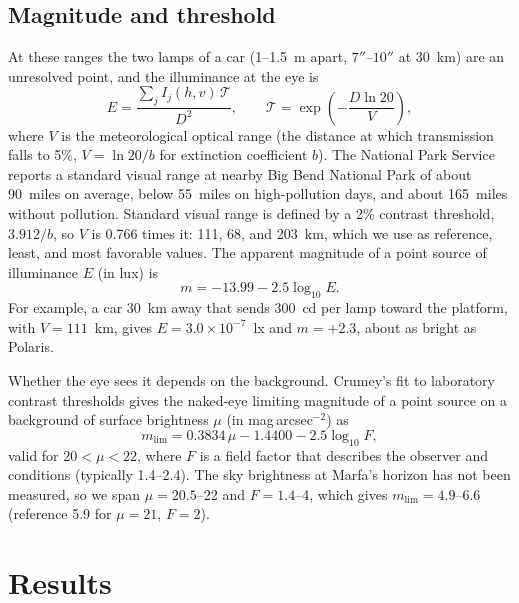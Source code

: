 \documentclass[aip,jap,amsmath,amssymb,reprint,floatfix]{revtex4-2}
\begin{document}
\subsection{Magnitude and threshold}

At these ranges the two lamps of a car (1--1.5~m apart, $7''$--$10''$ at 30~km) are an unresolved point, and the illuminance at the eye is
\begin{equation}
E = \frac{\sum_j I_j(h,v)\,\mathcal T}{D^2},\qquad \mathcal T=\exp\!\left(-\frac{D\ln20}{V}\right),
\label{eq:illum}
\end{equation}
where $V$ is the meteorological optical range (the distance at which transmission falls to 5\%, $V=\ln 20/b$ for extinction coefficient $b$). The National Park Service reports a standard visual range at nearby Big Bend National Park of about 90~miles on average, below 55~miles on high-pollution days, and about 165~miles without pollution.\cite{NPS_BIBE} Standard visual range is defined by a 2\% contrast threshold, $3.912/b$, so $V$ is 0.766 times it: 111, 68, and 203~km, which we use as reference, least, and most favorable values. The apparent magnitude of a point source of illuminance $E$ (in lux) is\cite{Schaefer1993}
\begin{equation}
m = -13.99 - 2.5\log_{10}E.
\label{eq:mag}
\end{equation}
For example, a car 30~km away that sends 300~cd per lamp toward the platform, with $V=111$~km, gives $E=3.0\times10^{-7}$~lx and $m=+2.3$, about as bright as Polaris.

Whether the eye sees it depends on the background. Crumey's fit to laboratory contrast thresholds gives the naked-eye limiting magnitude of a point source on a background of surface brightness $\mu$ (in mag\,arcsec$^{-2}$) as\cite{Crumey2014}
\begin{equation}
m_{\mathrm{lim}} = 0.3834\,\mu - 1.4400 - 2.5\log_{10}F,
\label{eq:mlim}
\end{equation}
valid for $20<\mu<22$, where $F$ is a field factor that describes the observer and conditions (typically 1.4--2.4). The sky brightness at Marfa's horizon has not been measured, so we span $\mu=20.5$--22 and $F=1.4$--4, which gives $m_{\mathrm{lim}}=4.9$--6.6 (reference 5.9 for $\mu=21$, $F=2$).

\section{Results}\label{sec:results}
\end{document}
